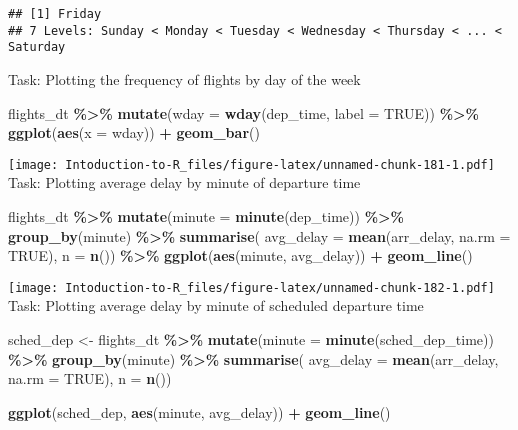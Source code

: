 \documentclass[
]{article}
\newenvironment{Shaded}{\begin{snugshade}}{\end{snugshade}}
\newcommand{\AttributeTok}[1]{\textcolor[rgb]{0.13,0.29,0.53}{#1}}
\newcommand{\ConstantTok}[1]{\textcolor[rgb]{0.56,0.35,0.01}{#1}}
\newcommand{\FunctionTok}[1]{\textcolor[rgb]{0.13,0.29,0.53}{\textbf{#1}}}
\newcommand{\NormalTok}[1]{#1}
\newcommand{\OtherTok}[1]{\textcolor[rgb]{0.56,0.35,0.01}{#1}}
\newcommand{\SpecialCharTok}[1]{\textcolor[rgb]{0.81,0.36,0.00}{\textbf{#1}}}
\begin{document}
\begin{verbatim}
## [1] Friday
## 7 Levels: Sunday < Monday < Tuesday < Wednesday < Thursday < ... < Saturday
\end{verbatim}

Task: Plotting the frequency of flights by day of the week

\begin{Shaded}
\begin{Highlighting}[]
\NormalTok{flights\_dt }\SpecialCharTok{\%\textgreater{}\%} 
  \FunctionTok{mutate}\NormalTok{(}\AttributeTok{wday =} \FunctionTok{wday}\NormalTok{(dep\_time, }\AttributeTok{label =} \ConstantTok{TRUE}\NormalTok{)) }\SpecialCharTok{\%\textgreater{}\%} 
  \FunctionTok{ggplot}\NormalTok{(}\FunctionTok{aes}\NormalTok{(}\AttributeTok{x =}\NormalTok{ wday)) }\SpecialCharTok{+}
    \FunctionTok{geom\_bar}\NormalTok{()}
\end{Highlighting}
\end{Shaded}

\texttt{[image: Intoduction-to-R\_files/figure-latex/unnamed-chunk-181-1.pdf]}
Task: Plotting average delay by minute of departure time

\begin{Shaded}
\begin{Highlighting}[]
\NormalTok{flights\_dt }\SpecialCharTok{\%\textgreater{}\%} 
  \FunctionTok{mutate}\NormalTok{(}\AttributeTok{minute =} \FunctionTok{minute}\NormalTok{(dep\_time)) }\SpecialCharTok{\%\textgreater{}\%} 
  \FunctionTok{group\_by}\NormalTok{(minute) }\SpecialCharTok{\%\textgreater{}\%} 
  \FunctionTok{summarise}\NormalTok{(}
    \AttributeTok{avg\_delay =} \FunctionTok{mean}\NormalTok{(arr\_delay, }\AttributeTok{na.rm =} \ConstantTok{TRUE}\NormalTok{),}
    \AttributeTok{n =} \FunctionTok{n}\NormalTok{()) }\SpecialCharTok{\%\textgreater{}\%} 
  \FunctionTok{ggplot}\NormalTok{(}\FunctionTok{aes}\NormalTok{(minute, avg\_delay)) }\SpecialCharTok{+}
    \FunctionTok{geom\_line}\NormalTok{()}
\end{Highlighting}
\end{Shaded}

\texttt{[image: Intoduction-to-R\_files/figure-latex/unnamed-chunk-182-1.pdf]}
Task: Plotting average delay by minute of scheduled departure time

\begin{Shaded}
\begin{Highlighting}[]
\NormalTok{sched\_dep }\OtherTok{\textless{}{-}}\NormalTok{ flights\_dt }\SpecialCharTok{\%\textgreater{}\%} 
  \FunctionTok{mutate}\NormalTok{(}\AttributeTok{minute =} \FunctionTok{minute}\NormalTok{(sched\_dep\_time)) }\SpecialCharTok{\%\textgreater{}\%} 
  \FunctionTok{group\_by}\NormalTok{(minute) }\SpecialCharTok{\%\textgreater{}\%} 
  \FunctionTok{summarise}\NormalTok{(}
    \AttributeTok{avg\_delay =} \FunctionTok{mean}\NormalTok{(arr\_delay, }\AttributeTok{na.rm =} \ConstantTok{TRUE}\NormalTok{),}
    \AttributeTok{n =} \FunctionTok{n}\NormalTok{())}

\FunctionTok{ggplot}\NormalTok{(sched\_dep, }\FunctionTok{aes}\NormalTok{(minute, avg\_delay)) }\SpecialCharTok{+}
  \FunctionTok{geom\_line}\NormalTok{()}
\end{Highlighting}
\end{Shaded}
\end{document}
